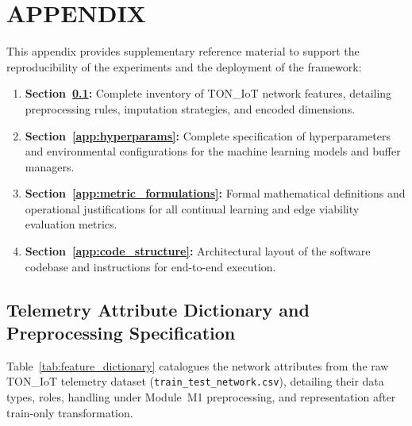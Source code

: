 \chapter*{APPENDIX}
\label{chap:appendix}

This appendix provides supplementary reference material to support the reproducibility of the experiments and the deployment of the framework:
\begin{enumerate}
    \item \textbf{Section~\ref{app:features}:} Complete inventory of TON\_IoT network features, detailing preprocessing rules, imputation strategies, and encoded dimensions.
    \item \textbf{Section~\ref{app:hyperparams}:} Complete specification of hyperparameters and environmental configurations for the machine learning models and buffer managers.
    \item \textbf{Section~\ref{app:metric_formulations}:} Formal mathematical definitions and operational justifications for all continual learning and edge viability evaluation metrics.
    \item \textbf{Section~\ref{app:code_structure}:} Architectural layout of the software codebase and instructions for end-to-end execution.
\end{enumerate}

\section{Telemetry Attribute Dictionary and Preprocessing Specification}
\label{app:features}

Table~\ref{tab:feature_dictionary} catalogues the network attributes from the raw TON\_IoT telemetry dataset (\texttt{train\_test\_network.csv}), detailing their data types, roles, handling under Module~M1 preprocessing, and representation after train-only transformation.

